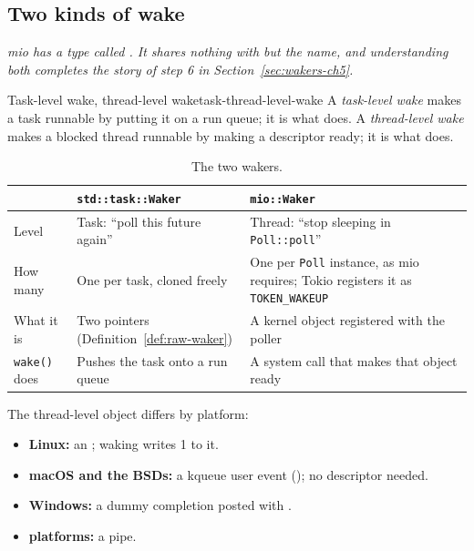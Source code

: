 \subsection{Two kinds of wake}
\label{sec:wakers-ch13}

\textit{mio has a type called . It shares nothing with  but the name, and understanding both completes the story of step 6 in Section~\ref{sec:wakers-ch5}.}

\begin{definition}{Task-level wake, thread-level wake}{task-thread-level-wake}
    A \emph{task-level wake} makes a task runnable by putting it on a run queue; it is what  does. A \emph{thread-level wake} makes a blocked thread runnable by making a descriptor ready; it is what  does.
\end{definition}

\begin{table}[htbp]
    \centering\small
    \begin{tabularx}{\linewidth}{>{\raggedright\arraybackslash}p{2.4cm} Y Y}
        \toprule
         & \textbf{\texttt{std::task::Waker}} & \textbf{\texttt{mio::Waker}} \\
        \midrule
        Level & Task: ``poll this future again'' & Thread: ``stop sleeping in \texttt{Poll::poll}'' \\
        How many & One per task, cloned freely & One per \texttt{Poll} instance, as mio requires; Tokio registers it as \texttt{TOKEN\_WAKEUP} \\
        What it is & Two pointers (Definition~\ref{def:raw-waker}) & A kernel object registered with the poller \\
        \texttt{wake()} does & Pushes the task onto a run queue & A system call that makes that object ready \\
        \bottomrule
    \end{tabularx}
    \caption{The two wakers.}
    \label{tab:wakers-13.1}
\end{table}

The thread-level object differs by platform:

\begin{itemize}
    \item \textbf{Linux:} an ; waking writes 1 to it.
    \item \textbf{macOS and the BSDs:} a kqueue user event (); no descriptor needed.
    \item \textbf{Windows:} a dummy completion posted with .
    \item \textbf{ platforms:} a pipe.
\end{itemize}


